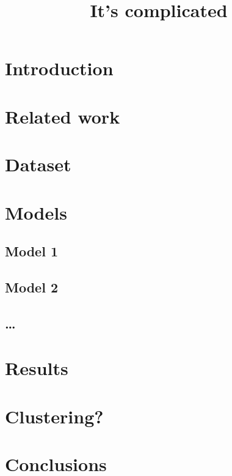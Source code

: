 \documentclass[10pt, a4paper]{article}
\title{It's complicated \emoji{1F384}}
\begin{document}
\maketitleabstract

\section{Introduction}

\section{Related work}

\section{Dataset}

\section{Models}

\subsection{Model 1}

\subsection{Model 2}

\subsection{\ldots}

\section{Results}

\section{Clustering?}

\section{Conclusions}



 
\end{document}
